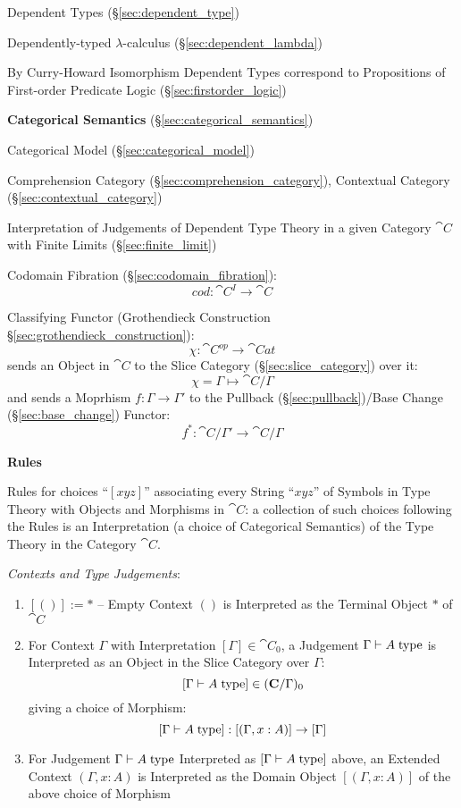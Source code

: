 Dependent Types (\S\ref{sec:dependent_type})

Dependently-typed $\lambda$-calculus (\S\ref{sec:dependent_lambda})

By Curry-Howard Isomorphism Dependent Types correspond to Propositions
of First-order Predicate Logic (\S\ref{sec:firstorder_logic})


\textbf{Categorical Semantics} (\S\ref{sec:categorical_semantics})

Categorical Model (\S\ref{sec:categorical_model})

Comprehension Category (\S\ref{sec:comprehension_category}),
Contextual Category (\S\ref{sec:contextual_category})

Interpretation of Judgements of Dependent Type Theory in a given
Category $\cat{C}$ with Finite Limits (\S\ref{sec:finite_limit})

Codomain Fibration (\S\ref{sec:codomain_fibration}):
\[
  cod:\cat{C}^I \rightarrow \cat{C}
\]

Classifying Functor (Grothendieck Construction
\S\ref{sec:grothendieck_construction}):
\[
  \chi : \cat{C}^{op} \rightarrow \cat{Cat}
\]
sends an Object in $\cat{C}$ to the Slice Category
(\S\ref{sec:slice_category}) over it:
\[
  \chi = \Gamma \mapsto \cat{C}/\Gamma
\]
and sends a Moprhism $f : \Gamma \rightarrow \Gamma'$ to the Pullback
(\S\ref{sec:pullback})/Base Change (\S\ref{sec:base_change}) Functor:
\[
  f^* : \cat{C}/\Gamma' \rightarrow \cat{C}/\Gamma
\]


\textbf{Rules}

Rules for choices ``$[xyz]$'' associating every String ``$xyz$'' of
Symbols in Type Theory with Objects and Morphisms in $\cat{C}$: a
collection of such choices following the Rules is an Interpretation (a
choice of Categorical Semantics) of the Type Theory in the Category
$\cat{C}$.

\emph{Contexts and Type Judgements}:
\begin{enumerate}
  \item $[()] := *$ -- Empty Context $()$ is Interpreted as the
    Terminal Object $*$ of $\cat{C}$
  \item For Context $\Gamma$ with Interpretation $[\Gamma] \in
    \cat{C}_0$, a Judgement $\Gamma \vdash A\;\mathrm{type}$ is Interpreted
    as an Object in the Slice Category over $\Gamma$:
    \[
      [\Gamma \vdash A\;\mathrm{type}] \in (\mathbf{C}/\Gamma)_0
    \]
    giving a choice of Morphism:
    \[
      [\Gamma \vdash A\;\mathrm{type}] : [(\Gamma,x:A)] \rightarrow [\Gamma]
    \]
  \item For Judgement $\Gamma \vdash A\;\mathrm{type}$ Interpreted as $[\Gamma
    \vdash A\;\mathrm{type}]$ above, an Extended Context $(\Gamma,x:A)$ is
    Interpreted as the Domain Object $[(\Gamma,x:A)]$ of the above
    choice of Morphism
\end{enumerate}

